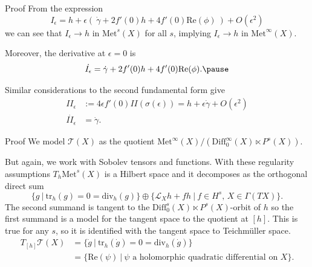 \documentclass[professionalfont]{beamer}
\newcommand{\two}{I\!I}
\begin{document}
\begin{frame}{Proof}
From the expression
\[
I_\epsilon = h + \epsilon( \ \dot{\gamma} + 2 f'(0)h + 4 f'(0) \mathrm{Re}(\phi) \ ) + O(\epsilon^2)
\]
we can see that $I_\epsilon \to h$ in $\mathrm{Met}^s(X)$ for all $s$, implying $I_\epsilon \to h$ in $\mathrm{Met}^\infty(X)$. 
\newline

Moreover, the derivative at $\epsilon = 0$ is 
\[
\dot{I_\epsilon}  = \dot{\gamma} + 2 f'(0) h + 4 f'(0) \mathrm{Re}(\phi). \pause
\]


Similar considerations to the second fundamental form give 
\begin{align*}
\two_\epsilon &:= 4\epsilon f'(0) \two(\sigma(\epsilon)) =  h + \epsilon \dot{\gamma} + O(\epsilon^2) \\
\dot{\two_\epsilon} &= \dot{\gamma}.
\end{align*} 

\end{frame}




\begin{frame}{Proof}
We model $\mathcal{T}(X)$ as the quotient $\mathrm{Met}^\infty(X)/(\mathrm{Diff}_0^\infty(X) \ltimes P^s(X))$. 

But again, we work with Sobolev tensors and functions. With these regularity assumptions $T_h\mathrm{Met}^s(X)$ is a Hilbert space and it decomposes as the orthogonal direct sum 
\[
\{ g \ | \ \mathrm{tr}_h (g) = 0 = \mathrm{div}_h(g) \} \oplus \{\mathcal{L}_X h + fh \ |\ f \in H^s \text{, } X \in \Gamma(TX) \}.
\] \pause 
The second summand is tangent to the $\mathrm{Diff}^s_0(X) \ltimes P^s(X)$-orbit of $h$ so the first summand is a model for the tangent space to the quotient at $[h]$. This is true for any $s$, so it is identified with the tangent space to Teichm\"uller space. \pause
\begin{align*}
T_{[h]}\mathcal{T}(X)
&= \{ \dot{g} \ | \ \mathrm{tr}_h (\dot{g}) = 0 = \mathrm{div}_h(\dot{g}) \} \\
&= \{ \mathrm{Re}(\psi) \ | \ \psi \text{ a holomorphic quadratic differential on } X \}.
\end{align*}

\end{frame}


\end{document}
